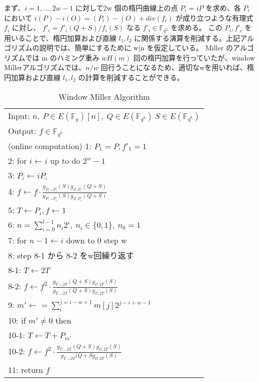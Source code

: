 まず、$i=1,\ldots,2w-1$ に対して2w 個の楕円曲線上の点 $P_i = iP$ を求め、各 $P_i$ において
$i(P) − i(O) = (P _i) − (O) + div(f _i)$ が成り立つような有理式 $f _i$ に対し、
$f' _i  = f' _i(Q + S) /f _i(S)$
なる $f' _i ∈ \mathbb{F}_{q^k}$ を求める。
この $P_i, f' _i$ を用いることで、楕円加算および直線 $l _1, l _2$
に関係する演算を削減する。上記アルゴリズムの説明では、簡単にするために w|n を仮定している。
 Miller のアルゴリズムでは m のハミング重み $wH (m)$ 回の楕円加算を行っていたが、window Millerアルゴリズムでは、$n/w$ 回行うことになるため、適切なwを用いれば、楕円加算および直線 $l _1, l _2$ の計算を削減することができる。
\par

\begin{table}[htbp]
 \begin{center}
  \begin{tabular}{|l|}
     \hline
     Input: $n, \ P \in E(\mathbb{F}_q)[n], \ Q \in E(\mathbb{F}_{q^k}) \ S \in E(\mathbb{F}_{q^k})$ \\
     Output: $f \in \mathbb{F}_{q^k}$  \\
     \hline
     (online computation)
     1: \quad $P_1 = P, f'_1=1 $\\
     2: \quad for $i \gets i$ up to do $2^w -1$\\
     3: \quad $P_i \gets iP_i $\\
     4: \quad \quad $f \gets f \cdot \frac{g_{P,-P_i}(S)g_{\mathcal{O},P_i}(Q+S)}{g_{P,-P_i}(S)g_{\mathcal{O},P_i}(Q+S)}$\\

     5: \quad $T \gets P_i, f \gets 1 $\\
     6: \quad $n=\sum^{l - 1}_{i=0} n_i 2^i, \ n_i \in \{0,1\},\ n_0 = 1$\\

     7: \quad for $ n-1 \gets i$ down to 0 step w\\
     8: \quad step 8-1 から 8-2 をw回繰り返す\\
     8-1: \quad $T \gets 2T $\\
     8-2: \quad \quad $f \gets f^2 \cdot \frac{g_{T,-2T}(Q+S)g_{\mathcal{O},2T}(S)}{g_{T,-2T}(Q+S)g_{\mathcal{O},2T}(S)}$\\

     9: \quad $m' \gets =\sum^{j=i-w+1}_{i} m[j]2^{j-i+w-1} $\\
     10: \quad if $m' \neq 0$ then\\
     10-1: \quad $T \gets T + P_{m'} $\\
     10-2: \quad \quad $f \gets f^2 \cdot \frac{g_{T,-2T}(Q+S)g_{\mathcal{O},2T}(S)}{g_{T,-2T}(Q+Sg_{\mathcal{O},2T}(S)}$ \\
     11: \quad return $f$\\
     \hline
   \end{tabular}
 \end{center}
 \caption{Window Miller Algorithm}
\end{table}
